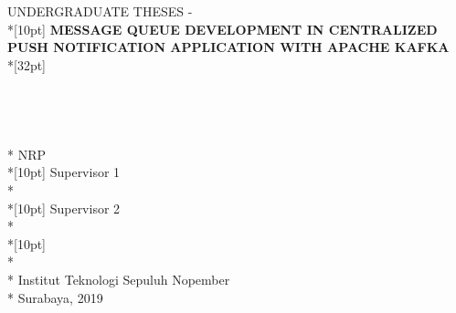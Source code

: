 \newpage
	\sffamily
	\thispagestyle{empty}
	{\noindent UNDERGRADUATE THESES - \kodematkul } \\*[10pt]
	{\large\textbf{\MakeUppercase{Message Queue Development in Centralized Push Notification Application with Apache Kafka}}} \\*[32pt]
	\\
	\\
	\\
	\\
	\MakeUppercase{\penulis} \\*
	NRP \nrp \\*[10pt]
	Supervisor 1 \\*
	\pembimbingsatu \\*[10pt]
	Supervisor 2 \\*
	\pembimbingdua \\*[10pt]
	\MakeUppercase{\jurusaneng} \\*
	\fakultaseng \\*
	Institut Teknologi Sepuluh Nopember \\*
	Surabaya, 2019
	\rmfamily
	\normalsize
	\restoregeometry
	\color{black}
	\cleardoublepage
